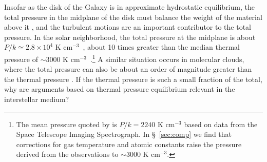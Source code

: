 \documentclass[12pt,preprint,flushrt]{aastex}
\newcommand{\eee}{$^{-3}$}
\begin{document}
        Insofar as the disk of the Galaxy is in approximate
hydrostatic equilibrium, the total pressure in
the midplane of the disk must balance the weight of the
material above it \citep{par69,bou90}, and the turbulent
motions are an important contributor to the total pressure.
In the solar neighborhood, the total pressure at the midplane is about
$P/k\simeq 2.8\times 10^4$ K cm\eee\ \citep{bou90},
about 10 times greater than the median thermal pressure
of $\sim 3000$ K cm\eee\
\citep{jen01}.\footnote{The mean pressure quoted
by \cite{jen01} is  $P/k = 2240$ K cm$^{-3}$ based on
data from the Space Telescope Imaging Spectrograph. In
\S~\ref{sec:comp} 
we find that corrections for gas temperature
and atomic constants raise the pressure derived from the observations
to $\sim 3000$ K cm$^{-3}$.}
A similar situation
occurs in molecular clouds, where the total pressure
can also be about an order of magnitude greater than the
thermal pressure \cite[depending on scale---see][]{lar81}.
If the thermal pressure is such a small fraction of
the total, why are arguments based on thermal pressure
equilibrium relevant in the interstellar medium?
\end{document}

